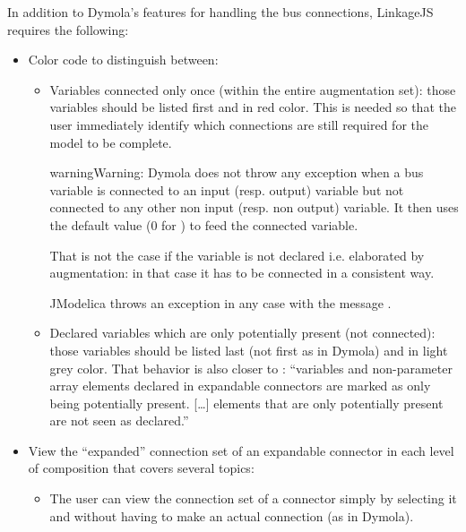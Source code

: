 \documentclass[letterpaper,10pt, openany,english]{sphinxmanual}
\begin{document}
In addition to Dymola’s features for handling the bus connections, LinkageJS requires the following:
\begin{itemize}
\item {} 
Color code to distinguish between:
\begin{itemize}
\item {} 
Variables connected only once (within the entire augmentation set): those variables should be listed first and in red color. This is needed so that the user immediately identify which connections are still required for the model to be complete.

\begin{sphinxadmonition}{warning}{Warning:}
Dymola does not throw any exception when a  bus variable is connected to an input (resp. output) variable but not connected to any other non input (resp. non output) variable. It then uses the default value (0 for ) to feed the connected variable.

That is not the case if the variable is not declared i.e. elaborated by augmentation: in that case it has to be connected in a consistent way.

JModelica throws an exception in any case with the message .
\end{sphinxadmonition}

\item {} 
Declared variables which are only potentially present (not connected): those variables should be listed last (not first as in Dymola) and in light grey color. That behavior is also closer to  : “variables and non-parameter array elements declared in expandable connectors are marked as only being potentially present. {[}…{]} elements that are only potentially present are not seen as declared.”

\end{itemize}

\item {} 
View the “expanded” connection set of an expandable connector in each level of composition \textendash{} that covers several topics:
\begin{itemize}
\item {} 
The user can view the connection set of a connector simply by selecting it and without having to make an actual connection (as in Dymola).


\end{itemize}
\end{itemize}
\end{document}
